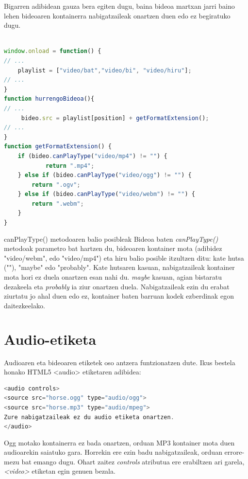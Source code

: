 Bigarren adibidean gauza bera egiten dugu, baina bideoa martxan jarri baino lehen bideoaren kontainerra nabigatzaileak onartzen duen edo ez begiratuko dugu. 

\begin{lstlisting}[language=JavaScript]

window.onload = function() {
// ...
	playlist = ["video/bat","video/bi", "video/hiru"];
// ...
}
function hurrengoBideoa(){
// ...
     bideo.src = playlist[position] + getFormatExtension();
// ...
}
function getFormatExtension() {
    if (bideo.canPlayType("video/mp4") != "") {
    	    return ".mp4";
    } else if (bideo.canPlayType("video/ogg") != "") {
        return ".ogv";
    } else if (bideo.canPlayType("video/webm") != "") {
        return ".webm";
    }
}
\end{lstlisting}


 \begin{alertinfo}{canPlayType() metodoaren balio posibleak}
        Bideoa baten \textit{canPlayType()} metodoak parametro bat hartzen du, bideoaren kontainer mota (adibidez "video/webm", edo "video/mp4") eta hiru balio posible itzultzen ditu: kate hutsa (""), "maybe" edo "probably". Kate hutsaren kasuan, nabigatzaileak kontainer mota hori ez duela onartzen esan nahi du. \textit{maybe} kasuan, agian bistaratu dezakeela eta \textit{probably} ia ziur onartzen duela. Nabigatzaileak ezin du erabat ziurtatu jo ahal duen edo ez, kontainer baten barruan kodek ezberdinak egon daitezkeelako.
    \end{alertinfo}

\section{Audio-etiketa}

Audioaren eta bideoaren etiketek oso antzera funtzionatzen dute. Ikus bestela honako HTML5 <audio> etiketaren adibidea:

\begin{lstlisting}[language=JavaScript]
<audio controls>
<source src="horse.ogg" type="audio/ogg">
<source src="horse.mp3" type="audio/mpeg">
Zure nabigatzaileak ez du audio etiketa onartzen.
</audio>
\end{lstlisting}

Ogg motako kontainerra ez bada onartzen, orduan MP3 kontainer mota duen audioarekin saiatuko gara. Horrekin ere ezin badu nabigatzaileak, orduan errore-mezu bat emango dugu. Ohart zaitez \textit{controls} atributua ere erabiltzen ari garela, \textit{<video>} etiketan egin genuen bezala.

